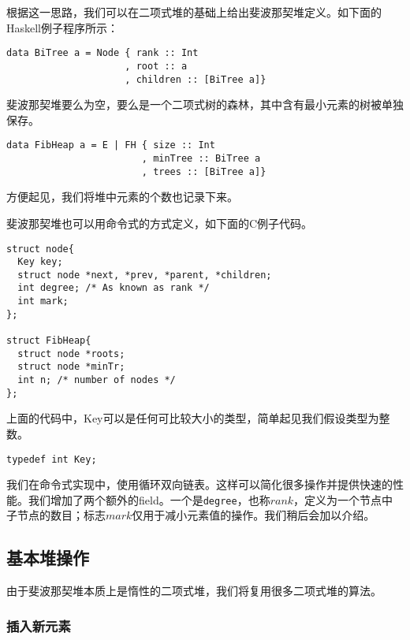\documentclass[UTF8]{article}
\begin{document}
根据这一思路，我们可以在二项式堆的基础上给出斐波那契堆定义。如下面的Haskell例子程序所示：

\lstset{language=Haskell}
\begin{lstlisting}
data BiTree a = Node { rank :: Int
                     , root :: a
                     , children :: [BiTree a]}
\end{lstlisting}

斐波那契堆要么为空，要么是一个二项式树的森林，其中含有最小元素的树被单独保存。

\begin{lstlisting}
data FibHeap a = E | FH { size :: Int
                        , minTree :: BiTree a
                        , trees :: [BiTree a]}
\end{lstlisting}

方便起见，我们将堆中元素的个数也记录下来。

斐波那契堆也可以用命令式的方式定义，如下面的C例子代码。

\lstset{language=C}
\begin{lstlisting}
struct node{
  Key key;
  struct node *next, *prev, *parent, *children;
  int degree; /* As known as rank */
  int mark;
};

struct FibHeap{
  struct node *roots;
  struct node *minTr;
  int n; /* number of nodes */
};
\end{lstlisting}

上面的代码中，Key可以是任何可比较大小的类型，简单起见我们假设类型为整数。

\lstset{language=C}
\begin{lstlisting}
typedef int Key;
\end{lstlisting}

我们在命令式实现中，使用循环双向链表\cite{CLRS}。这样可以简化很多操作并提供快速的性能。我们增加了两个额外的field。一个是\texttt{degree}，也称$rank$，定义为一个节点中子节点的数目；标志$mark$仅用于减小元素值的操作。我们稍后会加以介绍。


\subsection{基本堆操作}

由于斐波那契堆本质上是惰性的二项式堆，我们将复用很多二项式堆的算法。

\subsubsection{插入新元素}
\end{document}
